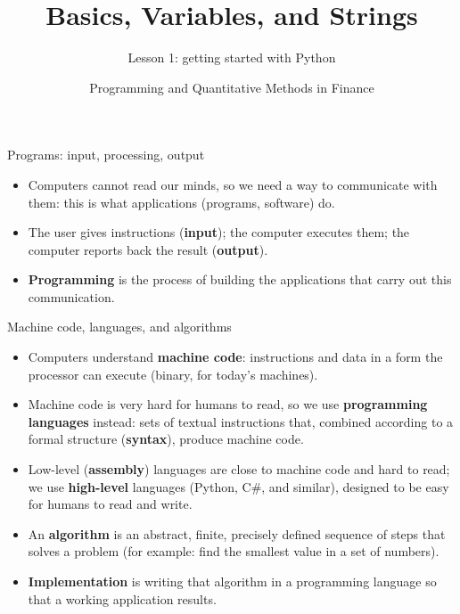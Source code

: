 \documentclass[aspectratio=169,11pt]{beamer}
\title{Basics, Variables, and Strings}
\subtitle{Lesson 1: getting started with Python}
\author{Programming and Quantitative Methods in Finance}
\date{}
\begin{document}
\titleandoutline


\begin{frame}{Programs: input, processing, output}
  \begin{itemize}
    \item Computers cannot read our minds, so we need a way to communicate
          with them: this is what applications (programs, software) do.
    \item The user gives instructions (\textbf{input}); the computer executes
          them; the computer reports back the result (\textbf{output}).
    \item \textbf{Programming} is the process of building the applications
          that carry out this communication.
  \end{itemize}
\end{frame}

\begin{frame}{Machine code, languages, and algorithms}
  \begin{itemize}
    \item Computers understand \textbf{machine code}: instructions and data in
          a form the processor can execute (binary, for today's machines).
    \item Machine code is very hard for humans to read, so we use
          \textbf{programming languages} instead: sets of textual instructions
          that, combined according to a formal structure (\textbf{syntax}),
          produce machine code.
    \item Low-level (\textbf{assembly}) languages are close to machine code and
          hard to read; we use \textbf{high-level} languages (Python, C\#, and
          similar), designed to be easy for humans to read and write.
    \item An \textbf{algorithm} is an abstract, finite, precisely defined
          sequence of steps that solves a problem (for example: find the
          smallest value in a set of numbers).
    \item \textbf{Implementation} is writing that algorithm in a programming
          language so that a working application results.
  \end{itemize}
\end{frame}
\end{document}
